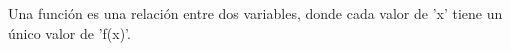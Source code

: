 \documentclass[preview]{standalone}
\begin{document}
\begin{center}
Una función es una relación entre dos variables, donde cada valor de 'x' tiene un único valor de 'f(x)'.
\end{center}
\end{document}
